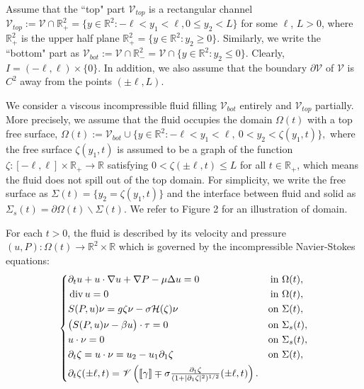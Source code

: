 \documentclass[letterpaper,reqno,10pt,twoside]{amsart}
\theoremstyle{definition}
\theoremstyle{remark}
\def\Om{\Omega}
\def\dive{\mathop{\rm div}\nolimits}
\def\d{\partial}
\begin{document}
	
	Assume that the ``top" part $\mathcal{V}_{top}$ is a rectangular channel
	$
	\mathcal{V}_{top}:=\mathcal{V}\cap\mathbb{R}^2_{+}=\{y\in\mathbb{R}^2: -\ell<y_1<\ell, 0\le y_2<L\}
	$
	for some $\ell$, $L>0$, where $\mathbb{R}^2_{+}$ is the upper half plane $\mathbb{R}^2_{+}=\{y\in\mathbb{R}^2: y_2\ge0\}$. Similarly, we write the ``bottom" part as
	$
	\mathcal{V}_{bot}:=\mathcal{V}\cap\mathbb{R}^2_{-}=\mathcal{V}\cap\{y\in\mathbb{R}^2: y_2\le0\}.
	$
	Clearly, $I=(-\ell, \ell)\times\{0\}$. In addition, we also assume that the boundary $\partial\mathcal{V}$ of $\mathcal{V}$ is $C^2$ away from the points $(\pm\ell, L)$.
	
	We consider a viscous incompressible fluid filling $\mathcal{V}_{bot}$ entirely and $\mathcal{V}_{top}$ partially. More precisely, we assume that the fluid occupies the domain $\Om(t)$ with a top free surface,
	$
	\Om(t):=\mathcal{V}_{bot}\cup\big\{y\in\mathbb{R}^2: -\ell<y_1<\ell,\ 0<y_2<\zeta(y_1,t)\big\},
	$
	where the free surface $\zeta(y_1,t)$ is assumed to be a graph of the function $\zeta: [-\ell, \ell]\times \mathbb{R}_{+}\rightarrow\mathbb{R}$ satisfying $0<\zeta(\pm\ell,t)\le L$ for all $t\in\mathbb{R}_+$, which means the fluid does not spill out of the top domain. For simplicity, we write the free surface as $\Sigma(t)=\{y_2=\zeta(y_1,t)\}$ and the interface between fluid and solid as $\Sigma_s(t)=\partial\Om(t)\backslash\Sigma(t)$.
	We refer to Figure 2 for an illustration of domain.
	
	For each $t>0$, the fluid is described by its velocity and pressure $(u,P):\Om(t)\rightarrow\mathbb{R}^2\times\mathbb{R}$ which is governed by the incompressible Navier-Stokes equations:
	\begin{equation}\label{eq:navier-stokes}
		\left\{
		\begin{aligned}
			&\d_t u+u\cdot\nabla u+\nabla P-\mu\Delta u=0 \quad & \text{in} &\ \Om(t),\\
			&\dive u=0 \quad & \text{in} &\ \Om(t),\\
			&S(P,u)\nu=g\zeta\nu-\sigma \mathcal{H}(\zeta)\nu \quad & \text{on} &\ \Sigma(t),\\
			&\big(S(P,u)\nu-\beta u\big)\cdot\tau=0 \quad & \text{on} &\ \Sigma_s(t),\\
			&u\cdot\nu=0 \quad & \text{on} &\ \Sigma_s(t),\\
			&\d_t\zeta=u\cdot\nu=u_2-u_1\partial_1\zeta \quad & \text{on} &\ \Sigma(t),\\\rule{0ex}{-1.5em}
			&\d_t\zeta(\pm\ell,t)=\mathscr{V}\left([\![\gamma]\!]\mp\sigma\tfrac{\partial_1\zeta}{(1+|\partial_1\zeta|^2)^{1/2}}(\pm\ell,t)\right).
		\end{aligned}
		\right.
	\end{equation}
	
\end{document}
